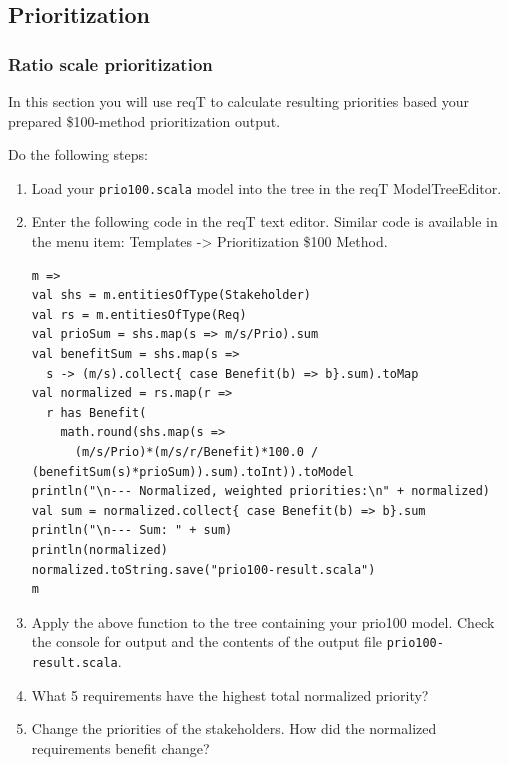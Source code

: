 \documentclass[11pt]{article}
\begin{document}
\subsection{Prioritization}


\subsubsection{Ratio scale prioritization}
In this section you will use reqT to calculate resulting priorities based your prepared \$100-method prioritization output. 
\begin{framed}
\noindent Do the following steps: 

\begin{enumerate}
\item Load your \verb+prio100.scala+ model into the tree in the reqT ModelTreeEditor.
\item Enter the following code in the reqT text editor. Similar code is available in the menu item:  Templates -> Prioritization \$100 Method.
\begin{lstlisting}
m =>    
val shs = m.entitiesOfType(Stakeholder)
val rs = m.entitiesOfType(Req)
val prioSum = shs.map(s => m/s/Prio).sum
val benefitSum = shs.map(s => 
  s -> (m/s).collect{ case Benefit(b) => b}.sum).toMap
val normalized = rs.map(r => 
  r has Benefit(
    math.round(shs.map(s => 
      (m/s/Prio)*(m/s/r/Benefit)*100.0 / (benefitSum(s)*prioSum)).sum).toInt)).toModel
println("\n--- Normalized, weighted priorities:\n" + normalized)
val sum = normalized.collect{ case Benefit(b) => b}.sum
println("\n--- Sum: " + sum)
println(normalized)
normalized.toString.save("prio100-result.scala")
m 
\end{lstlisting}
\item Apply the above function to the tree containing your prio100 model. Check the console for output and the contents of the output file \Verb+prio100-result.scala+.
\item What 5 requirements have the highest total normalized priority?
\vspace{4em}
\item Change the priorities of the stakeholders. How did the normalized requirements benefit change?
\vspace{3em}

\end{enumerate}
\end{framed}
\end{document}
